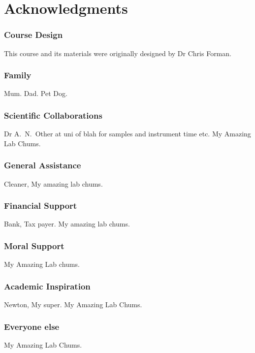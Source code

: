 \chapter*{Acknowledgments}

\subsection*{Course Design}
This course and its materials were originally designed by Dr Chris Forman.

\subsection*{Family}
Mum. Dad. Pet Dog.

\subsection*{Scientific Collaborations}
Dr A.\ N.\ Other at uni of blah for samples and instrument time etc. My Amazing Lab Chums.

\subsection*{General Assistance}
Cleaner, My amazing lab chums.

\subsection*{Financial Support}
Bank, Tax payer. My amazing lab chums.

\subsection*{Moral Support}
My Amazing Lab chums.

\subsection*{Academic Inspiration}
Newton, My super. My Amazing Lab Chums.

\subsection*{Everyone else}
My Amazing Lab Chums.
